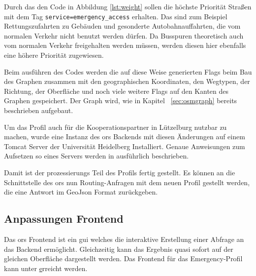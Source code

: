 Durch das den Code in Abbildung \ref{lst:weight} sollen die höchste Priorität Straßen mit dem Tag \texttt{service=emergency\_access} erhalten.
Das sind zum Beispiel Rettungszufahrten zu Gebäuden und gesonderte Autobahnauffahrten, die vom normalen Verkehr nicht benutzt werden dürfen.
Da Busspuren theoretisch auch vom normalen Verkehr freigehalten werden müssen, werden diesen hier ebenfalls eine höhere Priorität zugewiesen.

Beim ausführen des Codes werden die auf diese Weise generierten Flags beim Bau des Graphen zusammen mit den geographischen Koordinaten, den Wegtypen, der Richtung, der Oberfläche und noch viele weitere Flags auf den Kanten des Graphen gespeichert.
Der Graph wird, wie in Kapitel ~\ref{sec:osmgraph} bereits beschrieben aufgebaut.

Um das Profil auch für die Kooperationspartner in Lützelburg nutzbar zu machen, wurde eine Instanz des \gls{ors} Backends mit diesen Änderungen auf einem Tomcat Server der Universität Heidelberg Installiert.
Genaue Anweisungen zum Aufsetzen so eines Servers werden in \cite{neisdoktor} ausführlich beschrieben.

Damit ist der prozessierungs Teil des Profils fertig gestellt.
Es können an die Schnittstelle des \gls{ors} nun Routing-Anfragen mit dem neuen Profil gestellt werden, die eine Antwort im GeoJson Format zurückgeben.

%
%
%
%

\subsection{Anpassungen Frontend}

Das \gls{ors} Frontend ist ein \gls{gui} welches die interaktive Erstellung einer Abfrage an das Backend ermöglicht.
Gleichzeitig kann das Ergebnis quasi sofort auf der gleichen Oberfläche dargestellt werden.
Das Frontend für das Emergency-Profil kann unter \href{www.emergency.openrouteservice.org} erreicht werden.

\bigskip

